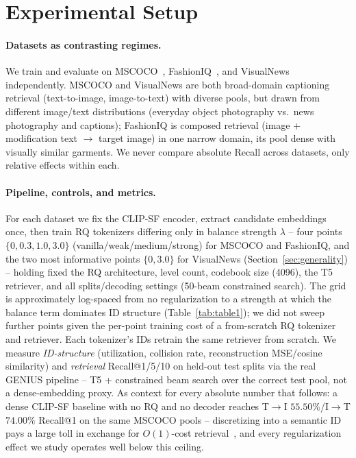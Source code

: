 \section{Experimental Setup}
\label{sec:setup}

\paragraph{Datasets as contrasting regimes.} We train and evaluate on MSCOCO~\cite{lin2014mscoco}, FashionIQ~\cite{wu2021fashioniq}, and VisualNews~\cite{liu2021visualnews} independently. MSCOCO and VisualNews are both broad-domain captioning retrieval (text-to-image, image-to-text) with diverse pools, but drawn from different image/text distributions (everyday object photography vs.\ news photography and captions); FashionIQ is composed retrieval (image + modification text $\to$ target image) in one narrow domain, its pool dense with visually similar garments. We never compare absolute Recall across datasets, only relative effects within each.

\paragraph{Pipeline, controls, and metrics.} For each dataset we fix the CLIP-SF encoder, extract candidate embeddings once, then train RQ tokenizers differing only in balance strength $\lambda$ -- four points $\{0, 0.3, 1.0, 3.0\}$ (vanilla/weak/medium/strong) for MSCOCO and FashionIQ, and the two most informative points $\{0, 3.0\}$ for VisualNews (Section~\ref{sec:generality}) -- holding fixed the RQ architecture, level count, codebook size (4096), the T5 retriever, and all splits/decoding settings (50-beam constrained search). The grid is approximately log-spaced from no regularization to a strength at which the balance term dominates ID structure (Table~\ref{tab:table1}); we did not sweep further points given the per-point training cost of a from-scratch RQ tokenizer and retriever. Each tokenizer's IDs retrain the same retriever from scratch. We measure \emph{ID-structure} (utilization, collision rate, reconstruction MSE/cosine similarity) and \emph{retrieval} Recall@1/5/10 on held-out test splits via the real GENIUS pipeline -- T5 + constrained beam search over the correct test pool, not a dense-embedding proxy. As context for every absolute number that follows: a dense CLIP-SF baseline with no RQ and no decoder reaches T$\to$I $55.50\%$/I$\to$T $74.00\%$ Recall@1 on the same MSCOCO pools -- discretizing into a semantic ID pays a large toll in exchange for $O(1)$-cost retrieval~\cite{tay2022dsi,pradeep2023scale}, and every regularization effect we study operates well below this ceiling.

